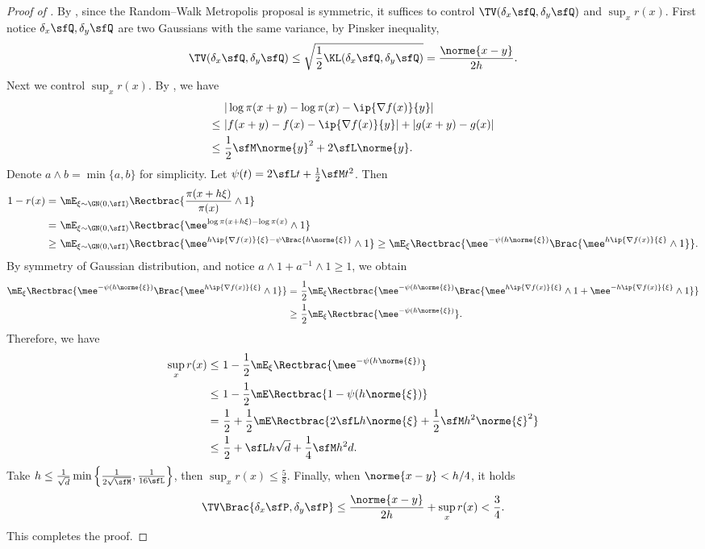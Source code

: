 \documentclass[11pt]{article}
\begin{document}
\begin{proof}[Proof of ]
%
By , since the Random--Walk Metropolis proposal is symmetric, it suffices to control $\TV(\delta_x \sfQ,\delta_y \sfQ)$ and $\sup_x r(x)$. 
%
First notice $\delta_x \sfQ,\delta_y \sfQ$ are two Gaussians with the same variance, by Pinsker inequality,
\[
    \TV (\delta_x \sfQ,\delta_y \sfQ) \le \sqrt{\frac{1}{2} \KL (\delta_x \sfQ,\delta_y \sfQ)} = \frac{\norme{x-y}}{2h}.
\]
Next we control $\sup_x r(x)$. By , we have
\begin{align*}
    &|\log \pi(x+y) - \log \pi(x) - \ip{\nabla f (x)}{y} | \\
    \le~& |f(x+y) - f(x) - \ip{\nabla f (x)}{y} | + |g(x+y) - g(x) | \\
    \le~& \frac{1}{2} \sfM \norme{y}^2 + 2 \sfL \norme{y}.
\end{align*}
Denote $a \wedge b = \min\{a,b\}$ for simplicity.
Let $\psi(t) = 2 \sfL t + \frac{1}{2} \sfM t^2 $.
Then 
\begin{align*}
    1 - r(x) =~& \mE_{\xi\sim \GN(0,\sfI)} \Rectbrac{ \frac{\pi(x+h\xi)}{\pi(x)} \wedge 1 } \\
    =~& \mE_{\xi\sim \GN(0,\sfI)} \Rectbrac{ \mee^{ \log \pi (x+h\xi) - \log \pi(x) } \wedge 1 }  \\
    \ge~& \mE_{\xi\sim \GN(0,\sfI)} \Rectbrac{ \mee^{ h \ip{\nabla f (x)}{\xi} - \psi \Brac{ h \norme{\xi} } } \wedge 1 } \ge \mE_\xi \Rectbrac{ \mee^{-\psi(h\norme{\xi})} \Brac{ \mee^{h\ip{\nabla f (x)}{\xi}} \wedge 1 } }.
\end{align*}
By symmetry of Gaussian distribution, and notice $a\wedge 1 + a^{-1} \wedge 1 \ge 1$, we obtain 
\begin{align*}
    \mE_\xi \Rectbrac{ \mee^{-\psi(h\norme{\xi})} \Brac{ \mee^{h\ip{\nabla f (x)}{\xi}} \wedge 1 } } =~& \frac{1}{2} \mE_\xi \Rectbrac{ \mee^{-\psi(h\norme{\xi})} \Brac{ \mee^{h\ip{\nabla f (x)}{\xi}} \wedge 1 + \mee^{-h\ip{\nabla f (x)}{\xi}} \wedge 1 } } \\
    \ge~& \frac{1}{2} \mE_\xi \Rectbrac{ \mee^{-\psi(h\norme{\xi})} }.
\end{align*}
Therefore, we have 
\begin{align*}
    \sup_x r(x) \le~& 1 - \frac{1}{2} \mE_\xi \Rectbrac{ \mee^{-\psi(h\norme{\xi})} } \\
    \le~& 1 - \frac{1}{2} \mE \Rectbrac{ 1 - \psi(h\norme{\xi}) } \\
    =~& \frac{1}{2} + \frac{1}{2} \mE \Rectbrac{ 2 \sfL h\norme{\xi} + \frac{1}{2} \sfM h^2 \norme{\xi}^2  } \\
    \le~& \frac{1}{2} + \sfL h \sqrt{d} + \frac{1}{4} \sfM h^2 d.
\end{align*}
Take $h\le \frac{1}{\sqrt{d}} \min \left\{ \frac{1}{2\sqrt{\sfM}}, \frac{1}{16\sfL} \right\}$, then $\sup_x r(x) \le \frac{5}{8}$. Finally, when $\norme{x-y}<h/4$, it holds
\[
    \TV \Brac{ \delta_x \sfP, \delta_y \sfP } \le \frac{\norme{x-y}}{2h} + \sup_x r(x) < \frac{3}{4}.
\]
This completes the proof.
\end{proof}
\end{document}
